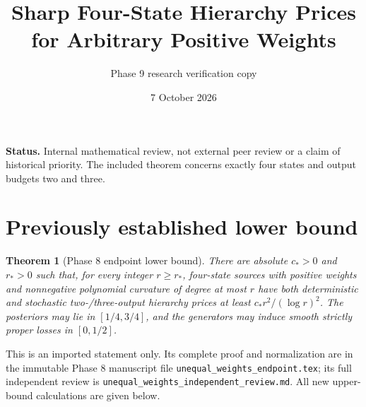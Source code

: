 \documentclass[11pt]{article}
\title{Sharp Four-State Hierarchy Prices\protect\\for Arbitrary Positive Weights}
\author{Phase 9 research verification copy}
\date{7 October 2026}
\newtheorem{theorem}{Theorem}[section]
\begin{document}
\maketitle
\noindent\textbf{Status.} Internal mathematical review, not external peer
review or a claim of historical priority. The included theorem concerns
exactly four states and output budgets two and three.

\section{Previously established lower bound}
\begin{theorem}[Phase 8 endpoint lower bound]
\label{thm:ext-weightdegenerate}
There are absolute $c_*>0$ and $r_*>0$ such that, for every integer
$r\ge r_*$, four-state sources with positive weights and nonnegative
polynomial curvature of degree at most $r$ have both deterministic and
stochastic two-/three-output hierarchy prices at least
$c_*r^2/(\log r)^2$. The posteriors may lie in $[1/4,3/4]$, and the
generators may induce smooth strictly proper losses in $[0,1/2]$.
\end{theorem}
\noindent This is an imported statement only. Its complete proof and
normalization are in the immutable Phase 8 manuscript file
\texttt{unequal\_weights\_endpoint.tex}; its full independent review is
\texttt{unequal\_weights\_independent\_review.md}. All new upper-bound
calculations are given below.


\end{document}
